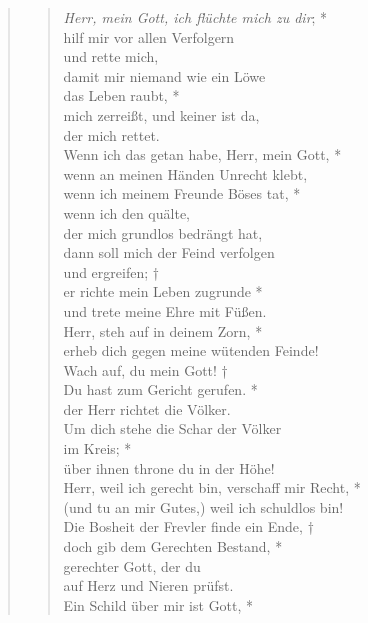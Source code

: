 


\begin{quote}
\begin{verse}


\smallskip

\textit{Herr, mein Gott, ich flüchte mich zu dir}; *\\
hilf mir vor allen Verfolgern\\
und rette mich,\\
\vin damit mir niemand wie ein Löwe\\ 
\vin das Leben raubt, *\\
\vin mich zerreißt, und keiner ist da,\\ 
\vin der mich rettet.\\
Wenn ich das getan habe, Herr, mein Gott, *\\
wenn an meinen Händen Unrecht klebt,\\
\vin wenn ich meinem Freunde Böses tat, *\\
\vin wenn ich den quälte, \\ 
\vin der mich grundlos bedrängt hat,\\
dann soll mich der Feind verfolgen\\
und ergreifen; †\\
er richte mein Leben zugrunde *\\
und trete meine Ehre mit Füßen.\\
\vin Herr, steh auf in deinem Zorn, *\\
\vin erheb dich gegen meine wütenden Feinde!\\
Wach auf, du mein Gott! †\\
Du hast zum Gericht gerufen. * \\
der Herr richtet die Völker.\\
\vin Um dich stehe die Schar der Völker\\ 
\vin im Kreis; *\\
\vin über ihnen throne du in der Höhe!\\
Herr, weil ich gerecht bin, verschaff mir Recht, *\\
(und tu an mir Gutes,) weil ich schuldlos bin!\\
\vin Die Bosheit der Frevler finde ein Ende, †\\
\vin doch gib dem Gerechten Bestand, *\\
\vin gerechter Gott, der du \\
\vin auf Herz und Nieren prüfst.\\
Ein Schild über mir ist Gott, *\\

\end{verse}
\end{quote}
